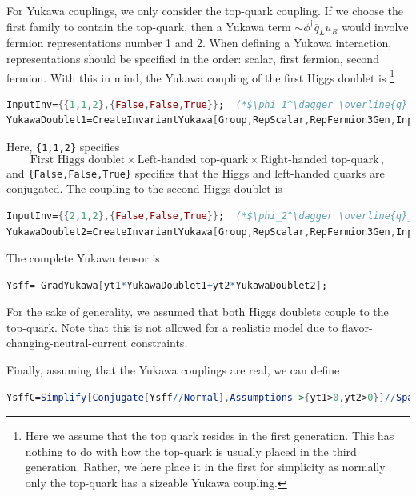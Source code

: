 \documentclass[11pt]{article}
\begin{document}
For Yukawa couplings, we only consider the top-quark coupling. 
If we choose the first family to contain the top-quark, then
a Yukawa term $\sim\phi^\dagger \overline{q}_L u_R^{ }$ would involve
fermion representations number 1 and 2.
When defining a Yukawa interaction, representations should be specified in the order: scalar, first fermion, second fermion.
With this in mind, the Yukawa coupling of the first Higgs doublet is%
\footnote{
  Here we assume that the top quark resides in the first generation.
  This has nothing to do with how the top-quark is usually placed in the third generation.
  Rather, we here place it in the first for simplicity as normally only the top-quark has a sizeable Yukawa coupling.
}
\begin{lstlisting}[language=Mathematica,mathescape=true]
InputInv={{1,1,2},{False,False,True}};  (*$\phi_1^\dagger \overline{q}_L u_R^{ } $*)
YukawaDoublet1=CreateInvariantYukawa[Group,RepScalar,RepFermion3Gen,InputInv][[1]]//Simplify;
\end{lstlisting}
Here,
{\verb!{1,1,2}!} specifies
$$
\text{First Higgs doublet}\times
\text{Left-handed top-quark}\times
\text{Right-handed top-quark}
\,,
$$
and
{\verb!{False,False,True}!}
specifies that the Higgs and left-handed quarks are conjugated.
The coupling to the second Higgs doublet is
\begin{lstlisting}[language=Mathematica,mathescape=true]
InputInv={{2,1,2},{False,False,True}};  (*$\phi_2^\dagger \overline{q}_L u_R^{ } $*)
YukawaDoublet2=CreateInvariantYukawa[Group,RepScalar,RepFermion3Gen,InputInv][[1]]//Simplify;
\end{lstlisting}
The complete Yukawa tensor is
\begin{lstlisting}[language=Mathematica,mathescape=true]
Ysff=-GradYukawa[yt1*YukawaDoublet1+yt2*YukawaDoublet2];
\end{lstlisting}
For the sake of generality,
we assumed that both Higgs doublets couple to the top-quark.
Note that this is not allowed for a realistic model due to flavor-changing-neutral-current constraints.

Finally, assuming that the Yukawa couplings are real, we can define
\begin{lstlisting}[language=Mathematica,mathescape=true]
YsffC=Simplify[Conjugate[Ysff//Normal],Assumptions->{yt1>0,yt2>0}]//SparseArray;
\end{lstlisting}
\end{document}
